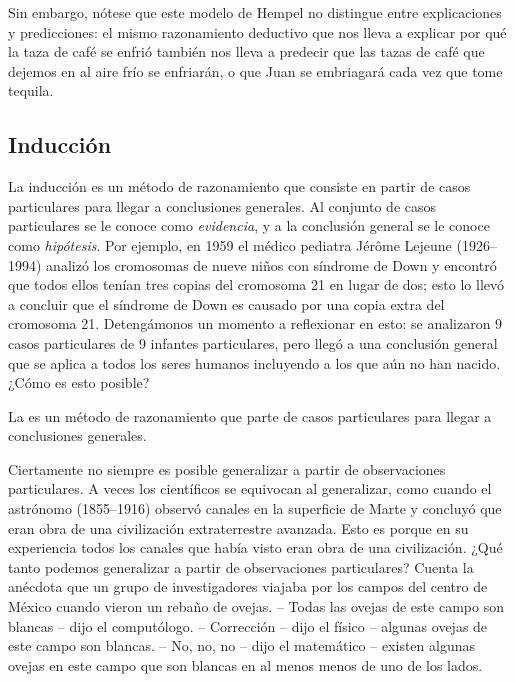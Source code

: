 Sin embargo, nótese que este modelo de Hempel no distingue entre explicaciones y predicciones: el mismo razonamiento deductivo que nos lleva a explicar por qué la taza de café se enfrió también nos lleva a predecir que las tazas de café que dejemos en al aire frío se enfriarán, o que Juan se embriagará cada vez que tome tequila.

\subsection*{Inducción}
\label{sub:induccion}
La inducción es un método de razonamiento que consiste en partir de casos particulares para llegar a conclusiones generales.
Al conjunto de casos particulares se le conoce como \emph{evidencia}, y a la conclusión general se le conoce como \emph{hipótesis}.
Por ejemplo, en 1959 el médico pediatra Jérôme Lejeune (1926--1994) analizó los cromosomas de nueve niños con síndrome de Down y encontró que todos ellos tenían tres copias del cromosoma 21 en lugar de dos; esto lo llevó a concluir que el síndrome de Down es causado por una copia extra del cromosoma 21\cite{Lejeune1959}.
Detengámonos un momento a reflexionar en esto: se analizaron 9 casos particulares de 9 infantes particulares, pero llegó a una conclusión general que se aplica a todos los seres humanos incluyendo a los que aún no han nacido.
¿Cómo es esto posible?

\begin{remember}
	\label{rem:induccion}
	La  es un método de razonamiento que parte de casos
	particulares para llegar a conclusiones generales.
\end{remember}

Ciertamente no siempre es posible generalizar a partir de observaciones particulares.
A veces los científicos se equivocan al generalizar, como cuando el astrónomo  (1855--1916) observó canales en la superficie de Marte y concluyó que eran obra de una civilización extraterrestre avanzada.
Esto es porque en su experiencia todos los canales que había visto eran obra de una civilización.
¿Qué tanto podemos generalizar a partir de observaciones particulares?
Cuenta la anécdota que un grupo de investigadores viajaba por los campos del centro de México cuando vieron un rebaño de ovejas. -- Todas las ovejas de este campo son blancas -- dijo el computólogo. -- Corrección -- dijo el físico -- algunas ovejas de este campo son blancas. -- No, no, no -- dijo el matemático -- existen algunas ovejas en este campo que son blancas en al menos menos de uno de los lados.

